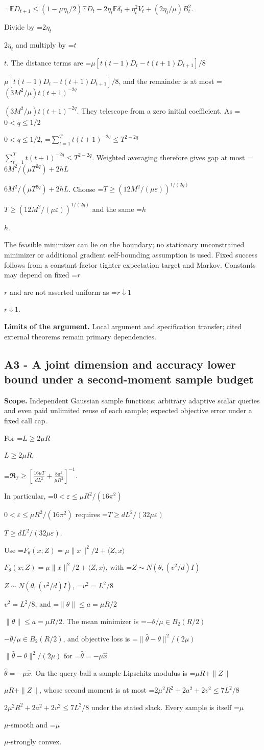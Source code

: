 \documentclass[10pt,a4paper]{article}
\newcommand{\AtlasMath}[1]{\par\begingroup\centering\setbox0=\hbox{$\displaystyle #1$}\ifdim\wd0>1.4\linewidth\typeout{ATLAS WIDE FORMULA: \the\wd0}\fi\ifdim\wd0>\linewidth\resizebox{\linewidth}{!}{\box0}\else\box0\fi\par\endgroup}
\newcommand{\AtlasInlineMath}[1]{\begingroup\setbox0=\hbox{$#1$}\ifdim\wd0>.4\linewidth\endgroup\AtlasMath{#1}\else\endgroup$#1$\fi}
\begin{document}
\AtlasMath{\mathbb ED_{t+1}\le(1-\mu\eta_t/2)\mathbb ED_t-2\eta_t\mathbb E\delta_t+\eta_t^2V_t+(2\eta_t/\mu)B_t^2.}

Divide by \AtlasInlineMath{2\eta_t} and multiply by \AtlasInlineMath{t}. The distance terms are \AtlasInlineMath{\mu[t(t-1)D_t-t(t+1)D_{t+1}]/8}, and the remainder is at most \AtlasInlineMath{(3M^2/\mu)t(t+1)^{-2q}}. They telescope from a zero initial coefficient. As \AtlasInlineMath{0<q\le1/2}, \AtlasInlineMath{\sum_{t=1}^Tt(t+1)^{-2q}\le T^{2-2q}}. Weighted averaging therefore gives gap at most \AtlasInlineMath{6M^2/(\mu T^{2q})+2hL}. Choose \AtlasInlineMath{T\ge(12M^2/(\mu\varepsilon))^{1/(2q)}} and the same \AtlasInlineMath{h}.

The feasible minimizer can lie on the boundary; no stationary unconstrained minimizer or additional gradient self-bounding assumption is used. Fixed success follows from a constant-factor tighter expectation target and Markov. Constants may depend on fixed \AtlasInlineMath{r} and are not asserted uniform as \AtlasInlineMath{r\downarrow1}.

\textbf{Limits of the argument.} Local argument and specification transfer; cited external theorems remain primary dependencies.

\subsection{A3 - A joint dimension and accuracy lower bound under a second-moment sample budget}
\textbf{Scope.} Independent Gaussian sample functions; arbitrary adaptive scalar queries and even paid unlimited reuse of each sample; expected objective error under a fixed call cap.

For \AtlasInlineMath{L\ge2\mu R},

\AtlasMath{\mathfrak R_T\ge\left[\frac{16\mu T}{dL^2}+\frac{8\pi^2}{\mu R^2}\right]^{-1}.}

In particular, \AtlasInlineMath{0<\varepsilon\le\mu R^2/(16\pi^2)} requires \AtlasInlineMath{T\ge dL^2/(32\mu\varepsilon)}.

Use \AtlasInlineMath{F_\theta(x;Z)=\mu\|x\|^2/2+\langle Z,x\rangle}, with \AtlasInlineMath{Z\sim N(\theta,(v^2/d)I)}, \AtlasInlineMath{v^2=L^2/8}, and \AtlasInlineMath{\|\theta\|\le a=\mu R/2}. The mean minimizer is \AtlasInlineMath{-\theta/\mu\in B_2(R/2)}, and objective loss is \AtlasInlineMath{\|\widehat\theta-\theta\|^2/(2\mu)} for \AtlasInlineMath{\widehat\theta=-\mu\widehat x}. On the query ball a sample Lipschitz modulus is \AtlasInlineMath{\mu R+\|Z\|}, whose second moment is at most \AtlasInlineMath{2\mu^2R^2+2a^2+2v^2\le7L^2/8} under the stated slack. Every sample is itself \AtlasInlineMath{\mu}-smooth and \AtlasInlineMath{\mu}-strongly convex.
\end{document}
